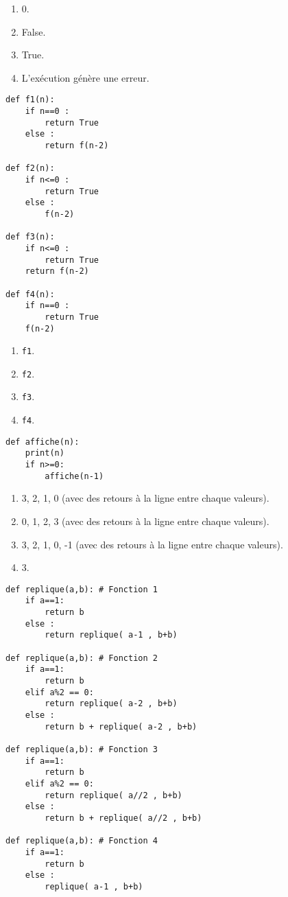 \begin{enumerate}
\item 0.
\item False.
\item True. %
\item L'exécution génère une erreur.
\end{enumerate}

\begin{lstlisting}
def f1(n):
    if n==0 :
        return True
    else :
        return f(n-2)
        
def f2(n):
    if n<=0 :
        return True
    else :
        f(n-2)
        
def f3(n):
    if n<=0 :
        return True
    return f(n-2)

def f4(n):
    if n==0 :
        return True
    f(n-2)
\end{lstlisting}


\begin{enumerate}
\item \texttt{f1}.
\item \texttt{f2}.
\item \texttt{f3}. %
\item \texttt{f4}.
\end{enumerate}

\begin{lstlisting}
def affiche(n):
    print(n)
    if n>=0:
        affiche(n-1)
\end{lstlisting}

\begin{enumerate}
\item 3, 2, 1, 0 (avec des retours à la ligne entre chaque valeurs).
\item 0, 1, 2, 3 (avec des retours à la ligne entre chaque valeurs).
\item 3, 2, 1, 0, -1 (avec des retours à la ligne entre chaque valeurs). %
\item 3.
\end{enumerate}

\begin{lstlisting}
def replique(a,b): # Fonction 1
    if a==1:
        return b
    else :
        return replique( a-1 , b+b)

def replique(a,b): # Fonction 2
    if a==1:
        return b
    elif a%2 == 0:
        return replique( a-2 , b+b)
    else :
        return b + replique( a-2 , b+b)

def replique(a,b): # Fonction 3
    if a==1:
        return b
    elif a%2 == 0:
        return replique( a//2 , b+b)
    else :
        return b + replique( a//2 , b+b)

def replique(a,b): # Fonction 4
    if a==1:
        return b
    else :
        replique( a-1 , b+b)
\end{lstlisting}

